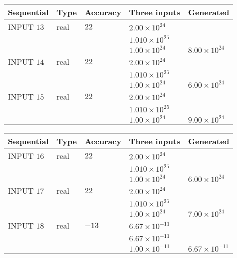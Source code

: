 \documentclass[12pt]{article}
\begin{document}
   
  
  
\noindent\begin{tabular}{|l|l|l|l|l|}
\hline
 Sequential & Type & Accuracy & Three inputs & Generated \\ 
\hline
 
 
  INPUT $           13 $ & real & $           22  $ & $
 2.00 \times 10^{24}
  $ & \\
  & & &  $
 1.010 \times 10^{25}
  $ & \\
  & & &  $
 1.00 \times 10^{24}
 $ & $ 8.00 \times 10^{24} $ 
 \\  \hline  
 
 
  INPUT $           14 $ & real & $           22  $ & $
 2.00 \times 10^{24}
  $ & \\
  & & &  $
 1.010 \times 10^{25}
  $ & \\
  & & &  $
 1.00 \times 10^{24}
 $ & $ 6.00 \times 10^{24} $ 
 \\  \hline  
 
 
  INPUT $           15 $ & real & $           22  $ & $
 2.00 \times 10^{24}
  $ & \\
  & & &  $
 1.010 \times 10^{25}
  $ & \\
  & & &  $
 1.00 \times 10^{24}
 $ & $ 9.00 \times 10^{24} $ 
 \\  \hline  
 \end{tabular}
   
   
  
  
\noindent\begin{tabular}{|l|l|l|l|l|}
\hline
 Sequential & Type & Accuracy & Three inputs & Generated \\ 
\hline
 
 
  INPUT $           16 $ & real & $           22  $ & $
 2.00 \times 10^{24}
  $ & \\
  & & &  $
 1.010 \times 10^{25}
  $ & \\
  & & &  $
 1.00 \times 10^{24}
 $ & $ 6.00 \times 10^{24} $ 
 \\  \hline  
 
 
  INPUT $           17 $ & real & $           22  $ & $
 2.00 \times 10^{24}
  $ & \\
  & & &  $
 1.010 \times 10^{25}
  $ & \\
  & & &  $
 1.00 \times 10^{24}
 $ & $ 7.00 \times 10^{24} $ 
 \\  \hline  
 
 
  INPUT $           18 $ & real & $          -13  $ & $
 6.67 \times 10^{-11}
  $ & \\
  & & &  $
 6.67 \times 10^{-11}
  $ & \\
  & & &  $
 1.00 \times 10^{-11}
 $ & $ 6.67 \times 10^{-11} $ 
 \\  \hline  
 \end{tabular}
   
\end{document}
